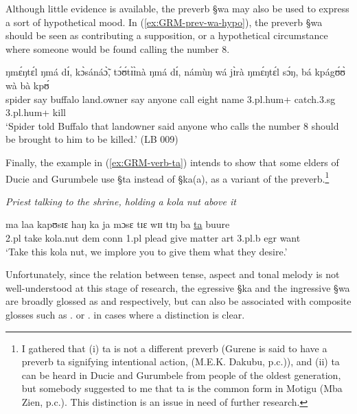 Although little evidence is available, the preverb {\S wa} may also be used to
express a sort of hypothetical  mood.  In  (\ref{ex:GRM-prev-wa-hypo}), the
preverb {\S wa} should be seen as contributing a supposition, or a hypothetical
circumstance where
someone would be found calling the number 8.


\begin{exe}
\ex\label{ex:GRM-prev-wa-hypo}

\gll ŋmɛ́ŋtɛ́l   ŋmá    dɪ́,    kɔ̀sánáɔ̃̀, 	tɔ́ʊ́tɪ̀ɪ̀nà  ŋmá 
dɪ́,  	námùŋ   wá    jɪ̀rà ŋmɛ́ŋtɛ́l sɔ́ŋ,  	bá  kpágʊ́ʊ̀    wà 
bà kpʊ́\\
spider     say   {\comp}   buffalo  	land.owner say {\comp}  anyone   
{\ingr}   call eight     name {\sc 3.pl.hum+}    catch.{\sc 3.sg} {\foc}
 {\sc 3.pl.hum+}  kill\\
\glt `Spider told Buffalo that landowner said anyone who calls the number 8
should be brought to him to be killed.' (LB 009)
\end{exe}



Finally, the example in (\ref{ex:GRM-verb-ta})  intends to show that some
elders of Ducie and
Gurumbele use  {\S ta}  instead of {\S ka(a)},  as a variant of the
preverb.\footnote{I gathered that  (i)   {\F ta} is not a different
preverb (Gurene is said to have  a preverb {\F ta}  signifying intentional
action, (M.E.K. Dakubu, p.c.)),  and  (ii)   {\F ta} can be heard in  Ducie and
Gurumbele from people of the oldest generation, but somebody suggested to me
that {\F ta} is the common form in Motigu (Mba Zien, p.c.).  This distinction
is an issue in need of further research. } 
 

\begin{exe}
   \ex\label{ex:GRM-verb-ta}{\it Priest talking to the shrine, holding a kola
nut above it}

\gll  ma laa kapʊsɪɛ haŋ ka ja mɔsɛ tɪɛ wɪɪ tɪŋ ba \underline{ta} buure\\
{\sc 2.pl} take kola.nut {\sc dem} {\sc conn} {\sc 1.pl} plead give matter {\sc
art} {\sc 3.pl.}b {\sc  egr} want\\
\glt   `Take this kola nut, we implore  you to give them what they desire.'

\end{exe}


Unfortunately, since the relation between tense, aspect and tonal melody is not
well-understood at this stage of research, the  egressive {\S ka}   and the
ingressive  {\S wa} are  broadly glossed as {\egr} and {\ingr} respectively, but
can also be associated with composite glosses such as {\ipfv .\fut} or  {\ipfv
.\pres}  in cases where a distinction is clear.




